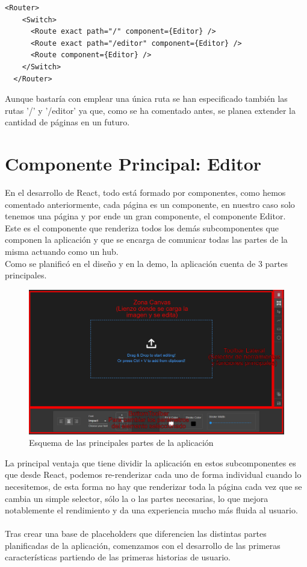 \begin{lstlisting}[caption={Componente Router de App.js}]
  <Router>
    <Switch>
      <Route exact path="/" component={Editor} />
      <Route exact path="/editor" component={Editor} />
      <Route component={Editor} />
    </Switch>
  </Router>
\end{lstlisting}

Aunque bastaría con emplear una única ruta se han especificado también las rutas '/' y '/editor' 
ya que, como se ha comentado antes, se planea extender la cantidad de páginas en un futuro.

\section{Componente Principal: Editor}

En el desarrollo de React, todo está formado por componentes, como hemos comentado anteriormente,
cada página es un componente, en nuestro caso solo tenemos una página y por ende un gran componente,
el componente Editor.
\\
Este es el componente que renderiza todos los demás subcomponentes que componen la aplicación
y que se encarga de comunicar todas las partes de la misma actuando como un hub.
\\
Como se planificó en el diseño y en la demo, la aplicación cuenta de 3 partes principales.

\begin{figure}[!h]
  \centering
  \includegraphics[scale=0.30]{img/ESQUEMA_PARTES.png}
  \caption{Esquema de las principales partes de la aplicación}
\end{figure}

\newpage
La principal ventaja que tiene dividir la aplicación en estos subcomponentes es que desde
React, podemos re-renderizar cada uno de forma individual cuando lo necesitemos, de esta forma
no hay que renderizar toda la página cada vez que se cambia un simple selector, sólo la o las
partes necesarias, lo que mejora notablemente el rendimiento y da una experiencia mucho más
fluida al usuario.
\\\\
Tras crear una base de placeholders que diferencien las distintas partes planificadas
de la aplicación, comenzamos con el desarrollo de las primeras características 
partiendo de las primeras historias de usuario.

